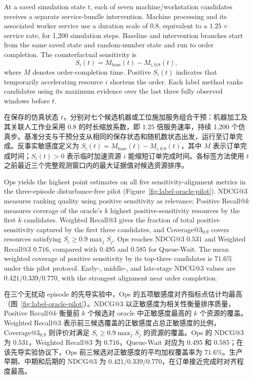 \documentclass[a4paper,fleqn]{cas-dc}
\newcommand{\zhpara}[1]{%
  \par\begingroup\small\color{black!72}\noindent #1\par\endgroup}
\begin{document}
At a saved simulation state $t$, each of seven machine/workstation candidates receives a separate service-bundle intervention. Machine processing and its associated worker service use a duration scale of $0.8$, equivalent to a $1.25\times$ service rate, for 1,200 simulation steps. Baseline and intervention branches start from the same saved state and random-number state and run to order completion. The counterfactual sensitivity is
\begin{equation}
S_i(t)=M_{\mathrm{base}}(t)-M_{i,0.8}(t),
\end{equation}
where $M$ denotes order-completion time. Positive $S_i(t)$ indicates that temporarily accelerating resource $i$ shortens the order. Each label method ranks candidates using its maximum evidence over the last three fully observed windows before $t$.

\zhpara{在保存的仿真状态 $t$，分别对七个候选机器或工位施加服务组合干预：机器加工及其关联人工作业采用 $0.8$ 的时长缩放系数，即 $1.25$ 倍服务速率，持续 1,200 个仿真步。基准分支与干预分支从相同的保存状态和随机数状态出发，运行至订单完成。反事实敏感度定义为 $S_i(t)=M_{\mathrm{base}}(t)-M_{i,0.8}(t)$，其中 $M$ 表示订单完成时间；$S_i(t)>0$ 表示临时加速资源 $i$ 能缩短订单完成时间。各标签方法使用 $t$ 之前最近三个完整观测窗口内的最大证据值对候选资源排序。}

Ops yields the highest point estimates on all five sensitivity-alignment metrics in the three-episode disturbance-free pilot (Figure~\ref{fig:label-oracle-pilot}). NDCG@3 measures ranking quality using positive sensitivity as relevance; Positive Recall@$k$ measures coverage of the oracle's $k$ highest positive-sensitivity resources by the first $k$ candidates. Weighted Recall@3 gives the fraction of total positive sensitivity captured by the first three candidates, and Coverage@3$_{0.9}$ covers resources satisfying $S_i\geq0.9\max_j S_j$. Ops reaches NDCG@3 $0.531$ and Weighted Recall@3 $0.716$, compared with $0.495$ and $0.585$ for Queue-Wait. The mean weighted coverage of positive sensitivity by its top-three candidates is $71.6\%$ under this pilot protocol. Early-, middle-, and late-stage NDCG@3 values are $0.421/0.339/0.770$, with the strongest alignment near order completion.

\zhpara{在三个无扰动 episode 的先导实验中，Ops 的五项敏感度对齐指标点估计均最高（图~\ref{fig:label-oracle-pilot}）。NDCG@3 以正敏感度为相关性衡量排序质量，Positive Recall@$k$ 衡量前 $k$ 个候选对 oracle 中正敏感度最高的 $k$ 个资源的覆盖。Weighted Recall@3 表示前三候选覆盖的正敏感度占总正敏感度的比例，Coverage@3$_{0.9}$ 则评价对满足 $S_i\geq0.9\max_j S_j$ 的资源的覆盖。Ops 的 NDCG@3 为 $0.531$，Weighted Recall@3 为 $0.716$，Queue-Wait 对应为 $0.495$ 和 $0.585$；在该先导实验协议下，Ops 前三候选对正敏感度的平均加权覆盖率为 $71.6\%$。生产早期、中期和后期的 NDCG@3 为 $0.421/0.339/0.770$，在订单接近完成时对齐程度最高。}
\end{document}
